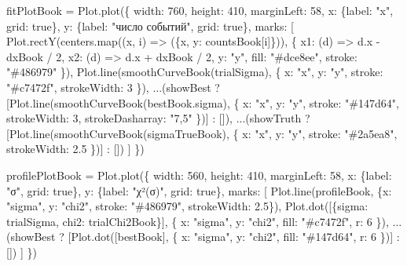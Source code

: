 \documentclass[
  russian,
  letterpaper,
]{scrbook}
\newenvironment{Shaded}{\begin{snugshade}}{\end{snugshade}}
\newcommand{\NormalTok}[1]{\textcolor[rgb]{0.00,0.23,0.31}{#1}}
\begin{document}
\begin{Shaded}
\begin{Highlighting}[]
\NormalTok{fitPlotBook = Plot.plot(\{}
\NormalTok{  width: 760,}
\NormalTok{  height: 410,}
\NormalTok{  marginLeft: 58,}
\NormalTok{  x: \{label: "x", grid: true\},}
\NormalTok{  y: \{label: "число событий", grid: true\},}
\NormalTok{  marks: [}
\NormalTok{    Plot.rectY(centers.map((x, i) =\textgreater{} (\{x, y: countsBook[i]\})), \{}
\NormalTok{      x1: (d) =\textgreater{} d.x {-} dxBook / 2,}
\NormalTok{      x2: (d) =\textgreater{} d.x + dxBook / 2,}
\NormalTok{      y: "y",}
\NormalTok{      fill: "\#dce8ee",}
\NormalTok{      stroke: "\#486979"}
\NormalTok{    \}),}
\NormalTok{    Plot.line(smoothCurveBook(trialSigma), \{}
\NormalTok{      x: "x", y: "y", stroke: "\#c7472f", strokeWidth: 3}
\NormalTok{    \}),}
\NormalTok{    ...(showBest ? [Plot.line(smoothCurveBook(bestBook.sigma), \{}
\NormalTok{      x: "x", y: "y", stroke: "\#147d64", strokeWidth: 3, strokeDasharray: "7,5"}
\NormalTok{    \})] : []),}
\NormalTok{    ...(showTruth ? [Plot.line(smoothCurveBook(sigmaTrueBook), \{}
\NormalTok{      x: "x", y: "y", stroke: "\#2a5ea8", strokeWidth: 2.5}
\NormalTok{    \})] : [])}
\NormalTok{  ]}
\NormalTok{\})}

\NormalTok{profilePlotBook = Plot.plot(\{}
\NormalTok{  width: 560,}
\NormalTok{  height: 410,}
\NormalTok{  marginLeft: 58,}
\NormalTok{  x: \{label: "σ", grid: true\},}
\NormalTok{  y: \{label: "χ²(σ)", grid: true\},}
\NormalTok{  marks: [}
\NormalTok{    Plot.line(profileBook, \{x: "sigma", y: "chi2", stroke: "\#486979", strokeWidth: 2.5\}),}
\NormalTok{    Plot.dot([\{sigma: trialSigma, chi2: trialChi2Book\}], \{}
\NormalTok{      x: "sigma", y: "chi2", fill: "\#c7472f", r: 6}
\NormalTok{    \}),}
\NormalTok{    ...(showBest ? [Plot.dot([bestBook], \{}
\NormalTok{      x: "sigma", y: "chi2", fill: "\#147d64", r: 6}
\NormalTok{    \})] : [])}
\NormalTok{  ]}
\NormalTok{\})}


\end{Highlighting}
\end{Shaded}
\end{document}
